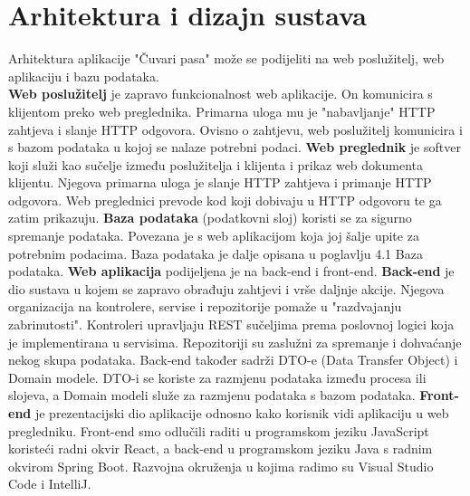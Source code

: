 \chapter{Arhitektura i dizajn sustava}
		
		Arhitektura aplikacije "Čuvari pasa" može se podijeliti na web poslužitelj, web aplikaciju i bazu podataka.
		\\
		\newline
		\textbf{Web poslužitelj} je zapravo funkcionalnost web aplikacije. On komunicira s klijentom preko web preglednika. Primarna uloga mu je "nabavljanje" HTTP zahtjeva i slanje HTTP odgovora. Ovisno o zahtjevu, web poslužitelj komunicira i s bazom podataka u kojoj se nalaze potrebni podaci. 
		\newline
		\textbf{Web preglednik} je softver koji služi kao sučelje između poslužitelja i klijenta i prikaz web dokumenta klijentu. Njegova primarna uloga je slanje HTTP zahtjeva i primanje HTTP odgovora. Web preglednici prevode kod koji dobivaju u HTTP odgovoru te ga zatim prikazuju.
		\newline
		\textbf{Baza podataka} (podatkovni sloj) koristi se za sigurno spremanje podataka. Povezana je s web aplikacijom koja joj šalje upite za potrebnim podacima. Baza podataka je dalje opisana u poglavlju 4.1 Baza podataka.
		\newline
		\textbf{Web aplikacija} podijeljena je na back-end i front-end. 
		\newline
		\textbf{Back-end} je dio sustava u kojem se zapravo obrađuju zahtjevi i vrše daljnje akcije. Njegova organizacija na kontrolere, servise i repozitorije pomaže u "razdvajanju zabrinutosti".
		Kontroleri upravljaju REST sučeljima prema poslovnoj logici koja je implementirana u servisima. Repozitoriji su zaslužni za spremanje i dohvaćanje nekog skupa podataka.
		Back-end također sadrži DTO-e (Data Transfer Object) i Domain modele. DTO-i se koriste za razmjenu podataka između procesa ili slojeva, a Domain modeli služe za razmjenu podataka s bazom podataka.
		\newline
		\textbf{Front-end} je prezentacijski dio aplikacije odnosno kako korisnik vidi aplikaciju u web pregledniku.
		\newline
		Front-end smo odlučili raditi u programskom jeziku JavaScript koristeći radni okvir React, a back-end u programskom jeziku Java s radnim okvirom Spring Boot. Razvojna okruženja u kojima radimo su Visual Studio Code i IntelliJ.
		

